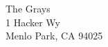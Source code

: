 \documentclass{article}
\begin{document}
\vspace*{\fill}
The Grays \\
1 Hacker Wy \\
Menlo Park, CA 94025 \par
\vspace*{\fill}
\end{document}
